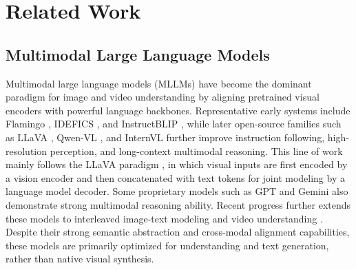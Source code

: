 \section{Related Work}
\label{sec:Related Work}


\subsection{Multimodal Large Language Models}
Multimodal large language models (MLLMs) have become the dominant paradigm for image and video understanding by aligning pretrained visual encoders with powerful language backbones.
Representative early systems include Flamingo \cite{alayrac2022flamingo}, IDEFICS \cite{laurenccon2023obelics}, and InstructBLIP \cite{dai2023instructblip}, while later open-source families such as LLaVA \cite{liu2023visual,liu2024improved,liu2024llavanext,li2024llava}, Qwen-VL \cite{Qwen-VL,Qwen2-VL,Qwen2.5-VL,Qwen3-VL}, and InternVL \cite{chen2024internvl,gao2024mini,chen2024far,wang2025internvl3_5} further improve instruction following, high-resolution perception, and long-context multimodal reasoning. 
This line of work mainly follows the LLaVA paradigm \cite{liu2023visual}, in which visual inputs are first encoded by a vision encoder \cite{radford2021learning,tschannen2025siglip} and then concatenated with text tokens for joint modeling by a language model decoder.
Some proprietary models such as GPT \cite{achiam2023gpt} and Gemini \cite{team2024gemini,team2023gemini} also demonstrate strong multimodal reasoning ability. 
Recent progress further extends these models to interleaved image-text modeling \cite{yang2024vision,cui2025emu3,deng2025emerging} and video understanding \cite{li2025videochat,lin2024video,yang2025cambrian}.
Despite their strong semantic abstraction and cross-modal alignment capabilities, these models are primarily optimized for understanding and text generation, rather than native visual synthesis.


